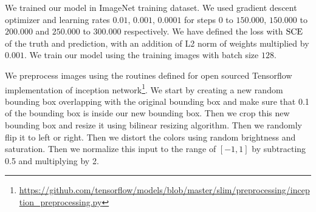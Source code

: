 We trained our model in ImageNet training dataset. We used gradient descent optimizer and learning rates $0.01$, $0.001$, $0.0001$ for steps $0$ to $150.000$, $150.000$ to $200.000$ and $250.000$ to $300.000$ respectively. We have defined the loss with $\textrm{SCE}$ of the truth and prediction, with an addition of L2 norm of weights multiplied by $0.001$. We train our model using the training images with batch size $128$.

We preprocess images using the routines defined for open sourced Tensorflow implementation of inception network\footnote{\url{https://github.com/tensorflow/models/blob/master/slim/preprocessing/inception_preprocessing.py}}. We start by creating a new random bounding box overlapping with the original bounding box and make sure that 0.1 of the bounding box is inside our new bounding box. Then we crop this new bounding box and resize it using bilinear resizing algorithm. Then we randomly flip it to left or right. Then we distort the colors using random brightness and saturation. Then we normalize this input to the range of $[-1,1]$ by subtracting 0.5 and multiplying by 2. 

